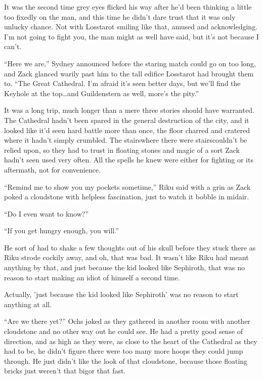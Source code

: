 It was the second time grey eyes flicked his way after he'd been thinking a little too fixedly on the man, and this time he didn't dare trust that it was only unlucky chance. Not with Losstarot smiling like that, amused and acknowledging. I'm not going to fight you, the man might as well have said, but it's not because I can't.

``Here we are,'' Sydney announced before the staring match could go on too long, and Zack glanced warily past him to the tall edifice Losstarot had brought them to. ``The Great Cathedral. I'm afraid it's seen better days, but we'll find the Keyhole at the top\ldots and Guildenstern as well, more's the pity.''

It was a long trip, much longer than a mere three stories should have warranted. The Cathedral hadn't been spared in the general destruction of the city, and it looked like it'd seen hard battle more than once, the floor charred and cratered where it hadn't simply crumbled. The stairs\textemdash where there were stairs\textemdash couldn't be relied upon, so they had to trust in floating stones and magic of a sort Zack hadn't seen used very often. All the spells he knew were either for fighting or its aftermath, not for convenience.

``Remind me to show you my pockets sometime,'' Riku said with a grin as Zack poked a cloudstone with helpless fascination, just to watch it bobble in midair.

``Do I even want to know?''

``If you get hungry enough, you will.''

He sort of had to shake a few thoughts out of his skull before they stuck there as Riku strode cockily away, and oh, that was bad. It wasn't like Riku had meant anything by that, and just because the kid looked like Sephiroth, that was no reason to start making an idiot of himself a second time.

Actually, 'just because the kid looked like Sephiroth' was no reason to start anything at all.

``Are we there yet?'' Ochs joked as they gathered in another room with another cloudstone and no other way out he could see. He had a pretty good sense of direction, and as high as they were, as close to the heart of the Cathedral as they had to be, he didn't figure there were too many more hoops they could jump through. He just didn't like the look of that cloudstone, because those floating bricks just weren't that big\textemdash or that fast.

